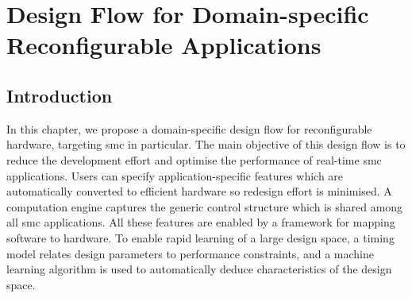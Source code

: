 
\chapter[Design Flow for Domain-specific Reconfigurable Applications]{Design Flow for Domain-specific Reconfigurable Applications}

\label{ch:tool}

\section{Introduction}
\label{sec:flow_intro}

In this chapter, we propose a domain-specific design flow for reconfigurable hardware, targeting \gls{smc} in particular.
The main objective of this design flow is to reduce the development effort and optimise the performance of real-time \gls{smc} applications.
Users can specify application-specific features which are automatically converted to efficient hardware so redesign effort is minimised.
A computation engine captures the generic control structure which is shared among all \gls{smc} applications.
All these features are enabled by a framework for mapping software to hardware. 
To enable rapid learning of a large design space, a timing model relates design parameters to performance constraints, and a machine learning algorithm is used to automatically deduce characteristics of the design space.

